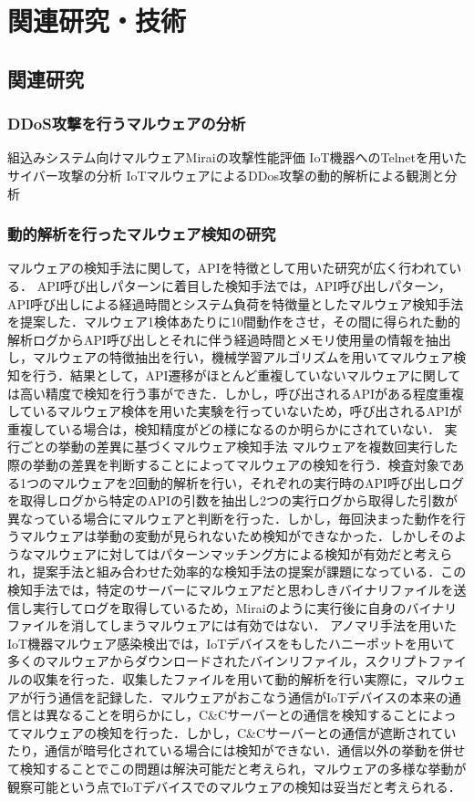 \chapter{関連研究・技術}
 
\section{関連研究}

\subsection{DDoS攻撃を行うマルウェアの分析}
	組込みシステム向けマルウェアMiraiの攻撃性能評価
    IoT機器へのTelnetを用いたサイバー攻撃の分析
    IoTマルウェアによるDDos攻撃の動的解析による観測と分析    
\subsection{動的解析を行ったマルウェア検知の研究} %

マルウェアの検知手法に関して，APIを特徴として用いた研究が広く行われている．
API呼び出しパターンに着目した検知手法では，API呼び出しパターン，API呼び出しによる経過時間とシステム負荷を特徴量としたマルウェア検知手法を提案した．マルウェア1検体あたりに10間動作をさせ，その間に得られた動的解析ログからAPI呼び出しとそれに伴う経過時間とメモリ使用量の情報を抽出し，マルウェアの特徴抽出を行い，機械学習アルゴリズムを用いてマルウェア検知を行う．結果として，API遷移がほとんど重複していないマルウェアに関しては高い精度で検知を行う事ができた．しかし，呼び出されるAPIがある程度重複しているマルウェア検体を用いた実験を行っていないため，呼び出されるAPIが重複している場合は，検知精度がどの様になるのか明らかにされていない．
実行ごとの挙動の差異に基づくマルウェア検知手法
マルウェアを複数回実行した際の挙動の差異を判断することによってマルウェアの検知を行う．検査対象である1つのマルウェアを2回動的解析を行い，それぞれの実行時のAPI呼び出しログを取得しログから特定のAPIの引数を抽出し2つの実行ログから取得した引数が異なっている場合にマルウェアと判断を行った．しかし，毎回決まった動作を行うマルウェアは挙動の変動が見られないため検知ができなかった．しかしそのようなマルウェアに対してはパターンマッチング方による検知が有効だと考えられ，提案手法と組み合わせた効率的な検知手法の提案が課題になっている．この検知手法では，特定のサーバーにマルウェアだと思わしきバイナリファイルを送信し実行してログを取得しているため，Miraiのように実行後に自身のバイナリファイルを消してしまうマルウェアには有効ではない．
アノマリ手法を用いたIoT機器マルウェア感染検出では，IoTデバイスをもしたハニーポットを用いて多くのマルウェアからダウンロードされたバインリファイル，スクリプトファイルの収集を行った．収集したファイルを用いて動的解析を行い実際に，マルウェアが行う通信を記録した．マルウェアがおこなう通信がIoTデバイスの本来の通信とは異なることを明らかにし，C\&Cサーバーとの通信を検知することによってマルウェアの検知を行った．しかし，C\&Cサーバーとの通信が遮断されていたり，通信が暗号化されている場合には検知ができない．通信以外の挙動を併せて検知することでこの問題は解決可能だと考えられ，マルウェアの多様な挙動が観察可能という点でIoTデバイスでのマルウェアの検知は妥当だと考えられる．

